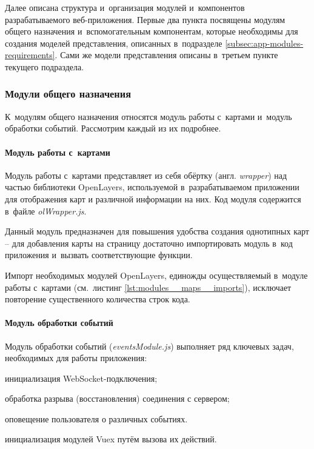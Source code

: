 Далее описана структура и~организация модулей и~компонентов разрабатываемого веб-приложения. Первые два пункта посвящены модулям общего назначения и~вспомогательным компонентам, которые необходимы для создания моделей представления, описанных в~подразделе \ref{subsec:app-modules-requirements}. Сами же модели представления описаны в~третьем пункте текущего подраздела.


\subsubsection{Модули общего назначения}

К~модулям общего назначения относятся модуль работы с~картами и~модуль обработки событий. Рассмотрим каждый из их подробнее.

\paragraph{Модуль работы с~картами}

Модуль работы с~картами представляет из себя обёртку (англ. \emph{wrapper}) над частью библиотеки OpenLayers, используемой в~разрабатываемом приложении для отображения карт и различной информации на них. Код модуля содержится в~файле \emph{olWrapper.js}.

\newpage

Данный модуль предназначен для повышения удобства создания однотипных карт -- для добавления карты на страницу достаточно импортировать модуль в~код приложения и~вызвать соответствующие функции.

Импорт необходимых модулей OpenLayers, единожды осуществляемый в~модуле работы с~картами (см.~листинг \ref{lst:modules__maps__imports}), исключает повторение существенного количества строк кода.





\paragraph{Модуль обработки событий}

Модуль обработки событий (\emph{eventsModule.js}) выполняет ряд ключевых задач, необходимых для работы приложения:
\begin{dashitemize}
  \item инициализация WebSocket-подключения;
  \item обработка разрыва (восстановления) соединения с сервером;
  \item оповещение пользователя о различных событиях.
  \item инициализация модулей Vuex путём вызова их действий.
\end{dashitemize}


